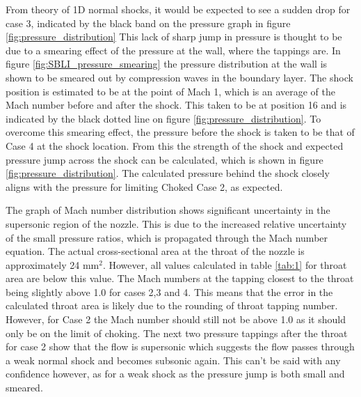 \documentclass{article}
\begin{document}
From theory of 1D normal shocks, it would be expected to see a sudden drop for case 3, indicated by the black band on the pressure graph in figure \ref{fig:pressure_distribution}
This lack of sharp jump in pressure is thought to be due to a smearing effect of the pressure at the wall, where the tappings are.
In figure \ref{fig:SBLI_pressure_smearing} the pressure distribution at the wall is shown to be smeared out by compression waves in the boundary layer.
The shock position is estimated to be at the point of Mach 1, which is an average of the Mach number before and after the shock.
This taken to be at position 16 and is indicated by the black dotted line on figure \ref{fig:pressure_distribution}.
To overcome this smearing effect, the pressure before the shock is taken to be that of Case 4 at the shock location.
From this the strength of the shock and expected pressure jump across the shock can be calculated, which is shown in figure \ref{fig:pressure_distribution}.
The calculated pressure behind the shock closely aligns with the pressure for limiting Choked Case 2, as expected.



The graph of Mach number distribution shows significant uncertainty in the supersonic region of the nozzle.
This is due to the increased relative uncertainty of the small pressure ratios, which is propagated through the Mach number equation.
The actual cross-sectional area at the throat of the nozzle is approximately 24 mm$^2$.
However, all values calculated in table \ref{tab:1} for throat area are below this value.
The Mach numbers at the tapping closest to the throat being slightly above 1.0 for cases 2,3 and 4.
This means that the error in the calculated throat area is likely due to the rounding of throat tapping number.
However, for Case 2 the Mach number should still not be above 1.0 as it should only be on the limit of choking.
The next two pressure tappings after the throat for case 2 show that the flow is supersonic which suggests the flow passes through a weak normal shock and becomes subsonic again.
This can't be said with any confidence however, as for a weak shock as the pressure jump is both small and smeared.
\end{document}
